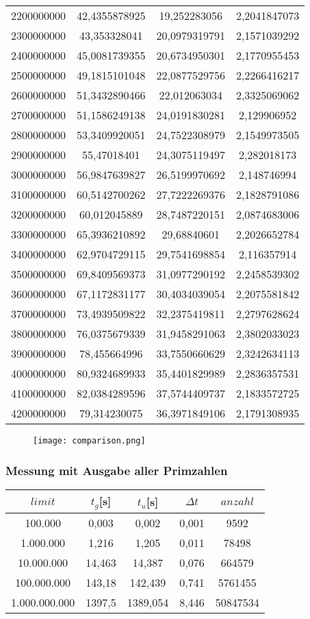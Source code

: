 \documentclass[a4paper,12pt]{article}
\begin{document}
\begin{tabular}{|c|c|c|c|}
2200000000 & 42,4355878925 & 19,252283056 & 2,2041847073\\
2300000000 & 43,353328041 & 20,0979319791 & 2,1571039292\\
2400000000 & 45,0081739355 & 20,6734950301 & 2,1770955453\\
2500000000 & 49,1815101048 & 22,0877529756 & 2,2266416217\\
2600000000 & 51,3432890466 & 22,012063034 & 2,3325069062\\
2700000000 & 51,1586249138 & 24,0191830281 & 2,129906952\\
2800000000 & 53,3409920051 & 24,7522308979 & 2,1549973505\\
2900000000 & 55,47018401 & 24,3075119497 & 2,282018173\\
3000000000 & 56,9847639827 & 26,5199970692 & 2,148746994\\
3100000000 & 60,5142700262 & 27,7222269376 & 2,1828791086\\
3200000000 & 60,012045889 & 28,7487220151 & 2,0874683006\\
3300000000 & 65,3936210892 & 29,68840601 & 2,2026652784\\
3400000000 & 62,9704729115 & 29,7541698854 & 2,116357914\\
3500000000 & 69,8409569373 & 31,0977290192 & 2,2458539302\\
3600000000 & 67,1172831177 & 30,4034039054 & 2,2075581842\\
3700000000 & 73,4939509822 & 32,2375419811 & 2,2797628624\\
3800000000 & 76,0375679339 & 31,9458291063 & 2,3802033023\\
3900000000 & 78,455664996 & 33,7550660629 & 2,3242634113\\
4000000000 & 80,9324689933 & 35,4401829989 & 2,2836357531\\
4100000000 & 82,0384289596 & 37,5744409737 & 2,1833572725\\
4200000000 & 79,314230075 & 36,3971849106 & 2,1791308935\\
\hline
\end{tabular}

\begin{figure}
\texttt{[image: comparison.png]}
\end{figure}


\subsubsection{Messung mit Ausgabe aller Primzahlen}
\begin{tabular}{|c|c|c|c|c|}
\hline
$limit$ & $t_g$[s] & $t_u$[s] & $\Delta t$ & $anzahl$ \\
\hline
100.000 & 0,003 & 0,002 & 0,001 & 9592\\
1.000.000 & 1,216 & 1,205 & 0,011 & 78498\\
10.000.000 & 14,463 & 14,387 & 0,076 & 664579\\
100.000.000 & 143,18 & 142,439 & 0,741 & 5761455\\
1.000.000.000 & 1397,5 & 1389,054 & 8,446 & 50847534\\
\hline
\end{tabular}
\newpage
\end{document}
